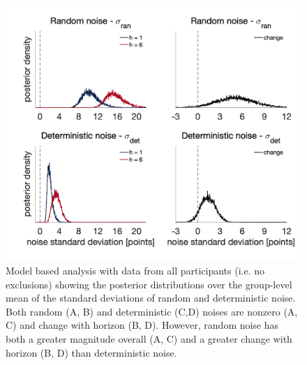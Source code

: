 \documentclass[12pt]{article}
\begin{document}
	\begin{figure}[H]
		\begin{center}
			\includegraphics[width=1\textwidth]{figures/RanDetNoise_hyperprior_all.png}
			\caption{Model based analysis with data from all participants (i.e. no exclusions) showing the posterior distributions over the group-level mean of the standard deviations of  random and deterministic noise. Both random (A, B) and deterministic (C,D) noises are nonzero (A, C) and change with horizon (B, D).  However, random noise has both a greater magnitude overall (A, C) and a greater change with horizon (B, D) than deterministic noise.}
			\label{fig:mb12}
		\end{center}
	\end{figure}
	
	
	
\end{document}

